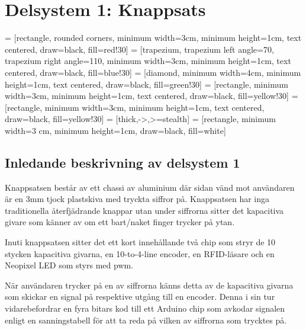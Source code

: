 \documentclass[twocolumn]{article}
\begin{document}
\clearpage

\section{Delsystem 1: Knappsats}
 = [rectangle, rounded corners, minimum width=3cm, minimum height=1cm, text centered, draw=black, fill=red!30]
 = [trapezium, trapezium left angle=70, trapezium right angle=110, minimum width=3cm, minimum height=1cm, text centered, draw=black, fill=blue!30]
 = [diamond, minimum width=4cm, minimum height=1cm, text centered, draw=black, fill=green!30]
 = [rectangle, minimum width=3cm, minimum height=1cm, text centered, draw=black, fill=yellow!30]
 = [rectangle, minimum width=3cm, minimum height=1cm, text centered, draw=black, fill=yellow!30]
 = [thick,->,>=stealth]
 = [rectangle, minimum width=3 cm, minimum height=1cm, draw=black, fill=white]


\subsection{Inledande beskrivning av delsystem 1}
Knappsatsen består av ett chassi av aluminium där sidan vänd mot användaren är en 3mm tjock plastskiva med tryckta siffror på. Knappsatsen har inga traditionella återfjädrande knappar utan under siffrorna sitter det kapacitiva givare som känner av om ett bart/naket finger trycker på ytan. 

Inuti knappsatsen sitter det ett kort innehållande två chip som stryr de 10 stycken kapacitiva givarna, en 10-to-4-line encoder, en RFID-läsare och en Neopixel LED som styrs med pwm. 

När användaren trycker på en av siffrorna känns detta av de kapacitiva givarna som skickar en signal på respektive utgång till en encoder. Denna i sin tur vidarebefordrar en fyra bitars kod till ett Arduino chip som avkodar signalen enligt en sanningstabell för att ta reda på vilken av siffrorna som trycktes på.
\end{document}
